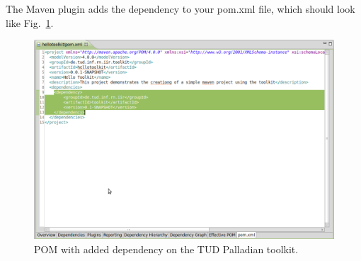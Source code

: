 The Maven plugin adds the dependency to your pom.xml file, which should look like Fig.~\ref{fig:pom01}.
\begin{figure}
\centering
\includegraphics[width=\textwidth]{img/ht06.png}
\caption{POM with added dependency on the TUD Palladian toolkit.}
\label{fig:pom01}
\end{figure}
